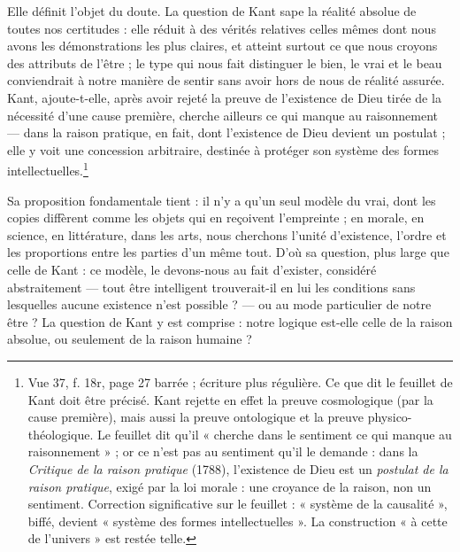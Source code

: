 \documentclass[11pt,a4paper]{article}
\begin{document}
Elle définit l'objet du doute. La question de Kant sape la réalité absolue de
toutes nos certitudes : elle réduit à des vérités relatives celles mêmes dont
nous avons les démonstrations les plus claires, et atteint surtout ce que nous
croyons des attributs de l'être ; le type qui nous fait distinguer le bien, le
vrai et le beau conviendrait à notre manière de sentir sans avoir hors de nous
de réalité assurée. Kant, ajoute-t-elle, après avoir rejeté la preuve de
l'existence de Dieu tirée de la nécessité d'une cause première, cherche ailleurs
ce qui manque au raisonnement — dans la raison pratique, en fait, dont
l'existence de Dieu devient un postulat ; elle y voit une concession arbitraire, destinée à
protéger son système des formes intellectuelles.\footnote{Vue 37, f. 18r, page
27 barrée ; écriture plus régulière. Ce que dit le feuillet de Kant doit être
précisé. Kant rejette en effet la preuve cosmologique (par la cause première),
mais aussi la preuve ontologique et la preuve physico-théologique. Le feuillet dit qu'il
« cherche dans le sentiment ce qui manque au raisonnement » ; or ce n'est pas au
sentiment qu'il le demande : dans la
\emph{Critique de la raison pratique} (1788), l'existence de Dieu est un
\emph{postulat de la raison pratique}, exigé par la loi morale : une croyance de la raison, non un
sentiment. Correction significative sur le
feuillet : « système de la causalité », biffé, devient « système des formes
intellectuelles ». La construction « à cette de l'univers » est restée telle.}

Sa proposition fondamentale tient : il n'y a qu'un seul modèle du vrai, dont
les copies diffèrent comme les objets qui en reçoivent l'empreinte ; en morale,
en science, en littérature, dans les arts, nous cherchons l'unité d'existence,
l'ordre et les proportions entre les parties d'un même tout. D'où sa question,
plus large que celle de Kant : ce modèle, le devons-nous au fait d'exister,
considéré abstraitement — tout être intelligent trouverait-il en lui les
conditions sans lesquelles aucune existence n'est possible ? — ou au mode
particulier de notre être ? La question de Kant y est comprise : notre logique
est-elle celle de la raison absolue, ou seulement de la raison humaine ?
\end{document}
